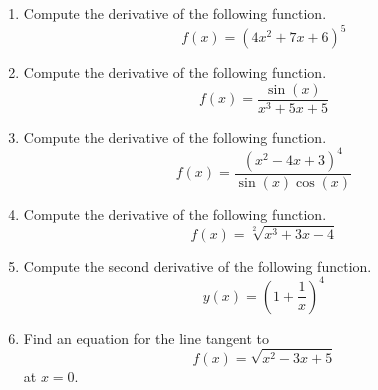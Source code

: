 \documentclass{article}
\begin{document}
\ActivityTitle[class=Calculus I, number=4, name=Differentiation II]

\begin{enumerate}
\item Compute the derivative of the following function. \[ f(x) = (4 x^2 + 7 x + 6)^{5} \]

  
\vspace{5cm}

\item Compute the derivative of the following function. \[ f(x) = \frac{\sin(x)}{x^3 + 5 x + 5} \]

  
\vspace{5cm}

\item Compute the derivative of the following function. \[ f(x) = \frac{(x^2 - 4 x + 3)^{4}}{\sin(x)\cos(x)} \]

  
\vspace{5cm}

\item Compute the derivative of the following function. \[ f(x) = \sqrt[2]{x^3 + 3 x - 4} \]

  
\vspace{5cm}

\item Compute the second derivative of the following function. \[ y(x) = \left( 1 + \frac{1}{x} \right)^{4} \]

  
\vspace{5cm}

\item Find an equation for the line tangent to \[ f(x) = \sqrt{x^2 - 3 x + 5} \] at $x = 0$.

  
\vspace{5cm}
\end{enumerate}
\end{document}
